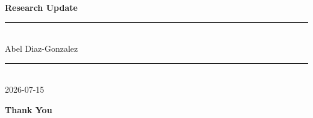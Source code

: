 
\newcommand{\updatedate}{2026-07-15} 
\newcommand{\myDynamicPath}{update-\updatedate/main.tex}




\begin{frame}[plain]
  \vfill
  \begin{center}
    {\Huge\bfseries\color{DeepBlue} Research Update}\\[0.7em]
    {\color{SkyBlue}\rule{0.35\linewidth}{1.6pt}}\\[0.7em]
    {\Large\color{SkyBlue}Abel Diaz-Gonzalez}\\
    {\color{SkyBlue}\rule{0.35\linewidth}{1.6pt}}\\[1.4em]
    {\large\color{DeepBlue!80!black} \updatedate}
  \end{center}
  \vfill
\end{frame}



\begin{frame}[plain]
  \vfill
  \begin{center}
    {\Huge\bfseries\color{DeepBlue} Thank You}
  \end{center}
  \vfill
\end{frame}


